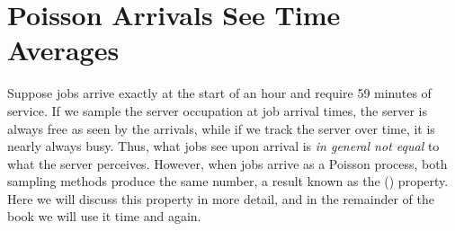 \documentclass[queueing-book.tex]{subfiles}
\begin{document}
\section{Poisson Arrivals See Time Averages}
\label{sec:poisson-arrivals-see}

Suppose jobs arrive exactly at the start of an hour and require 59 minutes of service.
If we sample the server occupation at job arrival times, the server is always free as seen by the arrivals, while if we track the server over time, it is nearly always busy.
Thus, what jobs see upon arrival is \emph{in general not equal} to what the server perceives.
However, when jobs arrive as a Poisson process, both sampling methods produce the same number, a result known as the  () property.
Here we will discuss this property in more detail, and in the remainder of the book we will use it time and again.
\end{document}

